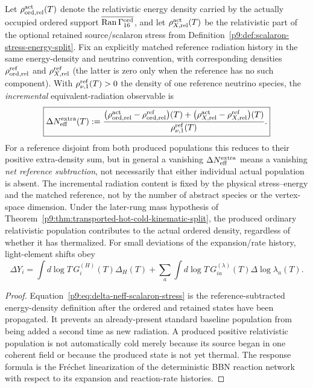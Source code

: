 \documentclass[12pt,a4paper]{article}
\begin{document}
\begin{theorem}
\label{p9:thm:finite-bbn-response}
Let \(\rho_{{\rm ord},\rm rel}^{\rm act}(T)\) denote the relativistic
energy density carried by the actually occupied ordered support
\(\overline{\operatorname{Ran}\Gamma_{16}^{\rm ord}}\), and let
\(\rho_{X,\rm rel}^{\rm act}(T)\) be the relativistic part of the optional
retained source/scalaron stress from
Definition~\ref{p9:def:scalaron-stress-energy-split}. Fix an explicitly
matched reference radiation history in the same energy-density and neutrino
convention, with corresponding densities
\(\rho_{{\rm ord},\rm rel}^{\rm ref}\) and
\(\rho_{X,\rm rel}^{\rm ref}\) (the latter is zero only when the reference
has no such component). With \(\rho_{\nu,1}^{\rm ref}(T)>0\) the density of
one reference neutrino species, the \emph{incremental} equivalent-radiation
observable is
\begin{equation}
\label{p9:eq:delta-neff-scalaron-stress}
\boxed{
\Delta N_{\rm eff}^{\rm extra}(T)
:=\frac{\bigl(\rho_{{\rm ord},\rm rel}^{\rm act}
                 -\rho_{{\rm ord},\rm rel}^{\rm ref}\bigr)(T)
          +\bigl(\rho_{X,\rm rel}^{\rm act}
                 -\rho_{X,\rm rel}^{\rm ref}\bigr)(T)}
        {\rho_{\nu,1}^{\rm ref}(T)}.}
\end{equation}
For a reference disjoint from both produced populations this reduces to
their positive extra-density sum, but in general a vanishing
\(\Delta N_{\rm eff}^{\rm extra}\) means a vanishing \emph{net reference
subtraction}, not necessarily that either individual actual population is
absent. The incremental radiation content is fixed by the physical
stress--energy and the matched reference, not by the number of abstract
species or the vertex-space dimension. Under the later-rung mass hypothesis
of Theorem~\ref{p9:thm:transported-hot-cold-kinematic-split}, the produced
ordinary relativistic population contributes to the actual ordered density,
regardless of whether it has thermalized.
For small deviations of the expansion/rate history, light-element shifts obey
\begin{equation}
\label{p9:eq:bbn-response-functional}
\Delta Y_i=
\int d\log T\,G_i^{(H)}(T)\Delta_H(T)
+\sum_a\int d\log T\,G_{ia}^{(\lambda)}(T)
\Delta\log\lambda_a(T).
\end{equation}
\end{theorem}

\begin{proof}
Equation~\eqref{p9:eq:delta-neff-scalaron-stress} is the reference-subtracted
energy-density definition after the ordered and retained states have been
propagated. It prevents an already-present standard baseline population from
being added a second time as new radiation. A produced positive relativistic
population is not automatically cold merely because its source began in one
coherent field or because the produced state is not yet thermal.  The response
formula is the Fr\'echet linearization of the deterministic BBN reaction
network with respect to its expansion and reaction-rate histories.
\end{proof}
\end{document}
